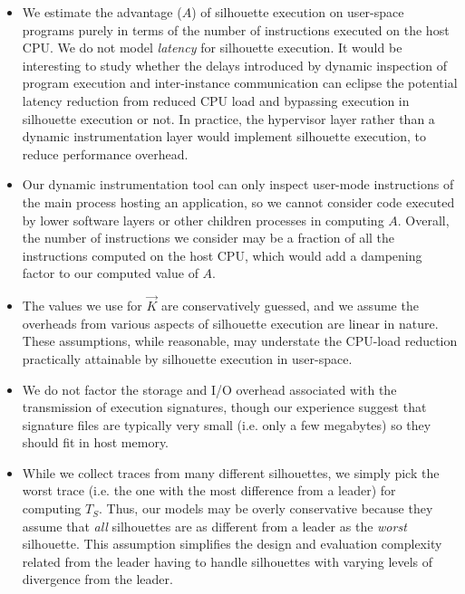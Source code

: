 \begin{itemize}
\item We estimate the advantage ($A$) of silhouette execution
on user-space programs purely in terms of the 
number of instructions executed on the host CPU.
We do not model {\em latency} for silhouette
execution. It would be interesting
to study whether the delays introduced
by dynamic inspection of program execution and inter-instance communication
can eclipse the potential latency reduction from reduced CPU load
and bypassing execution in silhouette
execution or not. In practice,
the hypervisor layer 
rather than a dynamic instrumentation layer
would implement silhouette execution,
to reduce performance overhead.

\item Our dynamic instrumentation tool
can only inspect user-mode instructions
of the main process hosting an application,
so we cannot consider code
executed by lower software layers or other
children processes in computing $A$.
Overall, the number of instructions
we consider may be a fraction of all the
instructions computed on the host CPU,
which would add a dampening factor 
to our computed value of $A$.

\item 
The values we use for $\vec K$ are 
conservatively guessed, and
we assume the overheads from various
aspects of silhouette execution are linear in nature.
These assumptions, while reasonable, may understate
the CPU-load reduction practically attainable by silhouette
execution in user-space.

\item We do not factor the storage and I/O overhead
associated with the transmission of execution
signatures, though our experience
suggest that signature files are typically
very small (i.e. only a few megabytes)
so they should fit in host memory.

\item While we collect traces from many different silhouettes,
we simply pick the worst trace (i.e. the one with
the most difference from a leader) for computing
$T_S$. Thus, our models may be overly conservative because they assume that {\em all} 
silhouettes are as different from a leader as the {\em worst} silhouette.
This assumption simplifies the design and evaluation complexity related
from the leader having to handle silhouettes
with varying levels of divergence from
the leader.

\end{itemize}

